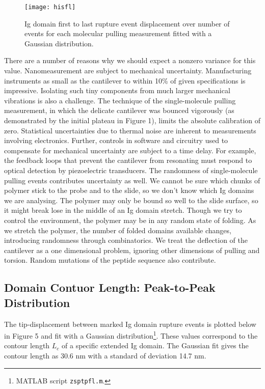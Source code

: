 \documentclass{article}
\begin{document}
\begin{figure}[H]
\texttt{[image: hisfl]}
\centering
\caption{Ig domain first to last rupture event displacement over number of events for each
molecular pulling measurement fitted with a Gaussian distribution.}
\end{figure}

There are a number of reasons why we should expect a nonzero variance for this value.
Nanomeasurement are subject to mechanical uncertainty. Manufacturing
instruments as small as the cantilever to within 10\% of given specifications is impressive.
Isolating such tiny components from much larger mechanical vibrations is also a challenge.
The technique of the single-molecule pulling measurement, in which the delicate cantilever 
was bounced vigorously (as demonstrated by the initial plateau in Figure 1), limits the 
absolute calibration of zero. 
Statistical uncertainties due to thermal noise are inherent to measurements involving 
electronics.  Further, controls in  software and circuitry used to 
compensate for mechanical uncertainty are subject to a time delay. For example,  the
feedback loops that prevent the cantilever from resonating must respond to optical
detection by piezoelectric transducers.
The randomness of single-molecule pulling events contributes uncertainty as well. We
cannot be sure which chunks of polymer stick to the probe and to the slide, so we don't 
know which Ig domains we are analysing. The polymer may only be bound so well to the
slide surface, so it might break lose in the middle of an Ig domain stretch. Though we try
to control the environment, the polymer may be in any random state of folding. As we stretch 
the polymer, the number of folded domains available changes, introducing randomness
through combinatorics. We treat
the deflection of the cantilever as a one dimensional problem, ignoring other dimensions of
pulling and torsion. Random mutations of the peptide sequence also contribute. 

\subsection{Domain Contuor Length: Peak-to-Peak Distribution}

The tip-displacement between marked Ig domain rupture events is plotted below in
Figure 5 and fit with a Gaussian
distribution\footnote{MATLAB script \texttt{zs\textunderscore ptp\textunderscore fl.m}.}.
These values correspond to the contour length $L_c$ of a specific extended Ig domain.
The Gaussian fit gives the contour length as 30.6 nm with a standard of 
deviation 14.7 nm.
\end{document}
